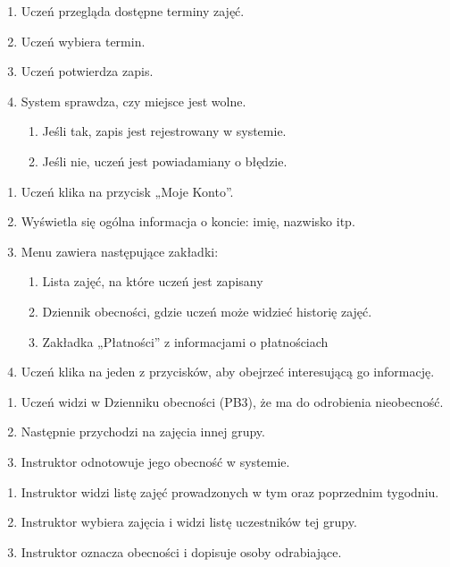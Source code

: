 \documentclass{article}
\begin{document}
\begin{enumerate}
    \item Uczeń przegląda dostępne terminy zajęć.
    \item Uczeń wybiera termin.
    \item Uczeń potwierdza zapis.
    \item System sprawdza, czy miejsce jest wolne.
    \begin{enumerate}
        \item Jeśli tak, zapis jest rejestrowany w systemie.
        \item Jeśli nie, uczeń jest powiadamiany o błędzie.
    \end{enumerate}
\end{enumerate}

\begin{enumerate}
    \item Uczeń klika na przycisk „Moje Konto”.
    \item Wyświetla się ogólna informacja o koncie: imię, nazwisko itp.
    \item Menu zawiera następujące zakładki:
    \begin{enumerate}
        \item Lista zajęć, na które uczeń jest zapisany
        \item Dziennik obecności, gdzie uczeń może widzieć historię zajęć.
        \item Zakładka „Płatności” z informacjami o płatnościach
    \end{enumerate}
    \item Uczeń klika na jeden z przycisków, aby obejrzeć interesującą go informację.
\end{enumerate}

\begin{enumerate}
    \item Uczeń widzi w Dzienniku obecności \textsc{(PB3),} że ma do odrobienia nieobecność.
    \item Następnie przychodzi na zajęcia innej grupy.
    \item Instruktor odnotowuje jego obecność w systemie.
\end{enumerate}

\begin{enumerate}
    \item Instruktor widzi listę zajęć prowadzonych w tym oraz poprzednim tygodniu.
    \item Instruktor wybiera zajęcia i widzi listę uczestników tej grupy.
    \item Instruktor oznacza obecności i dopisuje osoby odrabiające.
\end{enumerate}
\end{document}

